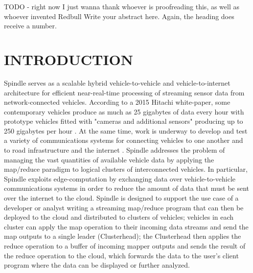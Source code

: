 \documentclass{thesis}
\author{William Rory Kronmiller}
\begin{document}
 
\titlepage             %
\tableofcontents       %
\listoftables          %
\listoffigures         %

   TODO - right now I just wanna thank whoever is proofreading this, as well as whoever invented Redbull 
Write your abstract here. Again, the heading does receive a number.

\chapter{INTRODUCTION}
    Spindle serves as a scalable hybrid vehicle-to-vehicle and vehicle-to-internet architecture
    for efficient near-real-time processing of streaming sensor data from network-connected vehicles.
    According to a 2015 Hitachi white-paper, some contemporary vehicles produce as much
    as 25 gigabytes of data every hour with prototype vehicles fitted with "cameras and additional
    sensors" producing up to 250 gigabytes per hour \cite{hitachi}. At the same time, work is underway
    to develop and test a variety of communications systems for connecting vehicles to one another
    and to road infrastructure and the internet \cite{connectivitypaper}. Spindle addresses the problem
    of managing the vast quantities of available vehicle data by applying the map/reduce \cite{mapreduce}
    paradigm to logical clusters of interconnected vehicles. In particular, Spindle exploits edge-computation
    by exchanging data over vehicle-to-vehicle communications systems in order to reduce the amount of data
    that must be sent over the internet to the cloud. Spindle is designed to support the use case
    of a developer or analyst writing a streaming map/reduce program that can then be deployed to the cloud
    and distributed to clusters of vehicles; vehicles in each cluster can apply the map operation to their
    incoming data streams and send the map outputs to a single leader (Clusterhead); the Clusterhead then
    applies the reduce operation to a buffer of incoming mapper outputs and sends the result of the reduce
    operation to the cloud, which forwards the data to the user's client program where the data can be
    displayed or further analyzed.
\end{document}
